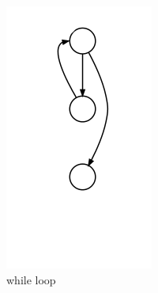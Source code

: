\begin{figure}[h]
\begin{subfigure}[t]{.24\textwidth}
	\centering
	\includegraphics[width=\linewidth]{cfgb.png}
	\caption{while loop}\label{fig:cfgb}		
	\end{subfigure}
	\begin{subfigure}[t]{.24\textwidth}
	\centering

\end{subfigure}
\end{figure}
